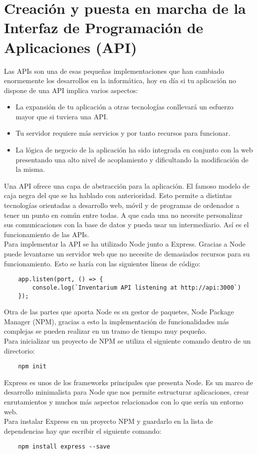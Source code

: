 \section{Creación y puesta en marcha de la Interfaz de Programación de Aplicaciones (API)}
Las APIs son una de esas pequeñas implementaciones que han cambiado enormemente los desarrollos en la informática, hoy en día si tu aplicación no dispone de una API \cite{api-definition} implica varios aspectos:

\begin{itemize}
    \item La expansión de tu aplicación a otras tecnologías conllevará un esfuerzo mayor que si tuviera una API.
    \item Tu servidor requiere más servicios y por tanto recursos para funcionar.
    \item La lógica de negocio de la aplicación ha sido integrada en conjunto con la web presentando una alto nivel de acoplamiento y dificultando la modificación de la misma.
\end{itemize}

Una API ofrece una capa de abstracción para la aplicación. El famoso modelo de caja negra del que se ha hablado con anterioridad. Esto permite a distintas tecnologías orientadas a desarrollo web, móvil y de programas de ordenador a tener un punto en común entre todas. A que cada una no necesite personalizar sus comunicaciones con la base de datos y pueda usar un intermediario. Así es el funcionamiento de las APIs.
\\Para implementar la API se ha utilizado Node junto a Express. Gracias a Node puede levantarse un servidor web que no necesite de demasiados recursos para su funcionamiento. Esto se haría con las siguientes líneas de código:
\begin{verbatim}
    app.listen(port, () => {
        console.log(`Inventarium API listening at http://api:3000`)
    });
\end{verbatim}
Otra de las partes que aporta Node es su gestor de paquetes, Node Package Manager (NPM), gracias a esto la implementación de funcionalidades más complejas se pueden realizar en un tramo de tiempo muy pequeño.
\\Para inicializar un proyecto de NPM se utiliza el siguiente comando dentro de un directorio:
\begin{verbatim}
    npm init
\end{verbatim}

Express \cite{node-express} es unos de los frameworks principales que presenta Node. Es un marco de desarrollo minimalista para Node que nos permite estructurar aplicaciones, crear enrutamientos y muchos más aspectos relacionados con lo que sería un entorno web.
\\Para instalar Express en un proyecto NPM y guardarlo en la lista de dependencias hay que escribir el siguiente comando:
\begin{verbatim}
    npm install express --save
\end{verbatim}

